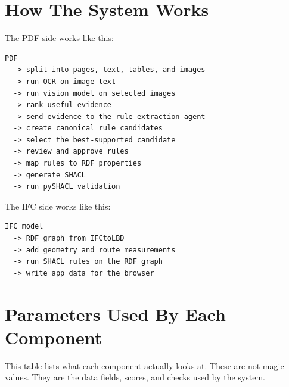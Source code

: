 \documentclass[11pt,a4paper]{article}
\begin{document}
\section{How The System Works}
The PDF side works like this:

\begin{verbatim}
PDF
  -> split into pages, text, tables, and images
  -> run OCR on image text
  -> run vision model on selected images
  -> rank useful evidence
  -> send evidence to the rule extraction agent
  -> create canonical rule candidates
  -> select the best-supported candidate
  -> review and approve rules
  -> map rules to RDF properties
  -> generate SHACL
  -> run pySHACL validation
\end{verbatim}

The IFC side works like this:

\begin{verbatim}
IFC model
  -> RDF graph from IFCtoLBD
  -> add geometry and route measurements
  -> run SHACL rules on the RDF graph
  -> write app data for the browser
\end{verbatim}

\section{Parameters Used By Each Component}
This table lists what each component actually looks at. These are not magic values. They are the data fields, scores, and checks used by the system.
\end{document}
